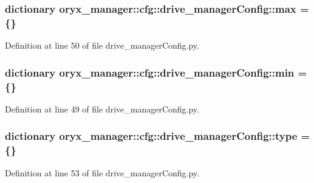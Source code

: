 \subsubsection[{max}]{\setlength{\rightskip}{0pt plus 5cm}dictionary {\bf oryx\-\_\-manager\-::cfg\-::drive\-\_\-manager\-Config\-::max} = \{\}}\label{namespaceoryx__manager_1_1cfg_1_1drive__managerConfig_a5515ec26df81b617d18ad72419f6382c}


\-Definition at line 50 of file drive\-\_\-manager\-Config.\-py.

\subsubsection[{min}]{\setlength{\rightskip}{0pt plus 5cm}dictionary {\bf oryx\-\_\-manager\-::cfg\-::drive\-\_\-manager\-Config\-::min} = \{\}}\label{namespaceoryx__manager_1_1cfg_1_1drive__managerConfig_a27bd18e1fe79bdd6f83ee4c824f7ce14}


\-Definition at line 49 of file drive\-\_\-manager\-Config.\-py.

\subsubsection[{type}]{\setlength{\rightskip}{0pt plus 5cm}dictionary {\bf oryx\-\_\-manager\-::cfg\-::drive\-\_\-manager\-Config\-::type} = \{\}}\label{namespaceoryx__manager_1_1cfg_1_1drive__managerConfig_aca8c87b3b6818aab42ab78f5dcb6cf39}


\-Definition at line 53 of file drive\-\_\-manager\-Config.\-py.

